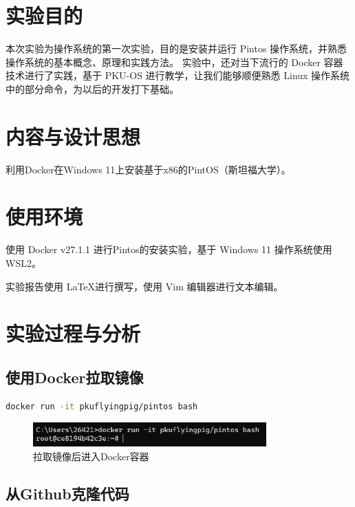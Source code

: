 \tableofcontents %

\section{实验目的}

本次实验为操作系统的第一次实验，目的是安装并运行 Pintos 操作系统，并熟悉操作系统的基本概念、原理和实践方法。
实验中，还对当下流行的 Docker 容器技术进行了实践，基于 PKU-OS 进行教学，让我们能够顺便熟悉 Linux 操作系统中的部分命令，为以后的开发打下基础。  

\section{内容与设计思想}

利用Docker在Windows 11上安装基于x86的PintOS（斯坦福大学）。

\section{使用环境}

使用 Docker v27.1.1 进行Pintos的安装实验，基于 Windows 11 操作系统使用 WSL2。

实验报告使用 \LaTeX 进行撰写，使用 Vim 编辑器进行文本编辑。

\section{实验过程与分析}

\subsection{使用Docker拉取镜像}

\begin{lstlisting}[language = bash, title = {拉取镜像}]
  docker run -it pkuflyingpig/pintos bash
\end{lstlisting}

\begin{figure} [H]
  \centering
  \includegraphics[width=0.8\textwidth]{img1/Dockerrun.png}
  \caption{拉取镜像后进入Docker容器}
  \label{fig:dockerrun}
\end{figure}

\subsection{从Github克隆代码}

